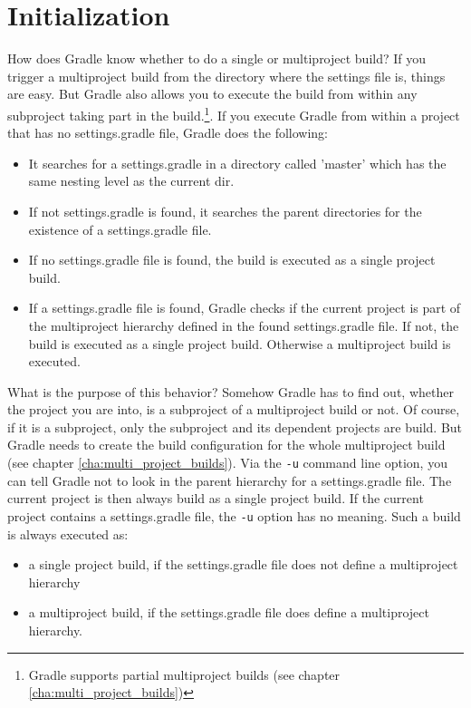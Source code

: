 \section{Initialization} %
\label{sec:initialization}
How does Gradle know whether to do a single or multiproject build? If you trigger a multiproject build from the directory where the settings file is, things are easy. But Gradle also allows you to execute the build from within any subproject taking part in the build.\footnote{Gradle supports partial multiproject builds (see chapter \ref{cha:multi_project_builds})}. If you execute Gradle from within a project that has no settings.gradle file, Gradle does the following:
\begin{itemize}
	\item It searches for a settings.gradle in a directory called 'master' which has the same nesting level as the current dir. 
	\item If not settings.gradle is found, it searches the parent directories for the existence of a settings.gradle file.
	\item If no settings.gradle file is found, the build is executed as a single project build.
    \item If a settings.gradle file is found, Gradle checks if the current project is part of the multiproject hierarchy defined in the found settings.gradle file. If not, the build is executed as a single project build. Otherwise a multiproject build is executed.
\end{itemize}
What is the purpose of this behavior? Somehow Gradle has to find out, whether the project you are into, is a subproject of a multiproject build or not. Of course, if it is a subproject, only the subproject and its dependent projects are build. But Gradle needs to create the build configuration for the whole multiproject build (see chapter \ref{cha:multi_project_builds}). Via the \texttt{-u} command line option, you can tell Gradle not to look in the parent hierarchy for a settings.gradle file. The current project is then always build as a single project build. If the current project contains a settings.gradle file, the \texttt{-u} option has no meaning. Such a build is always executed as:
\begin{itemize}
	\item a single project build, if the settings.gradle file does not define a multiproject hierarchy
    \item a multiproject build, if the settings.gradle file does define a multiproject hierarchy.
\end{itemize}
